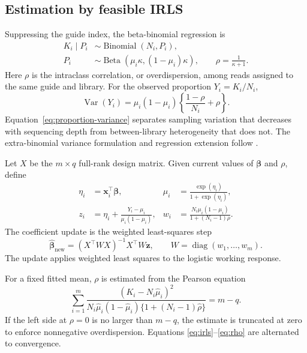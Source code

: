 \subsection{Estimation by feasible IRLS}
\label{sec:estimation}

Suppressing the guide index, the beta-binomial regression is
\begin{align}
  K_i\mid P_i &\sim \operatorname{Binomial}(N_i,P_i),\\
  P_i &\sim \operatorname{Beta}(\mu_i\kappa,(1-\mu_i)\kappa),
  \qquad \rho=\frac{1}{\kappa+1}.
\end{align}
Here $\rho$ is the intraclass correlation, or overdispersion, among reads
assigned to the same guide and library.  For the observed proportion
$Y_i=K_i/N_i$,
\begin{equation}
  \operatorname{Var}(Y_i)
  =\mu_i(1-\mu_i)
   \left\{\frac{1-\rho}{N_i}+\rho\right\}.
  \label{eq:proportion-variance}
\end{equation}
Equation~\eqref{eq:proportion-variance} separates sampling variation that
decreases with sequencing depth from between-library heterogeneity that does
not.  The extra-binomial variance formulation and regression extension follow \citet{williams1982extrabinomial,
baggerly2003differential,baggerly2004overdispersed}.

Let $X$ be the $m\times q$ full-rank design matrix.  Given current values of
$\boldsymbol{\beta}$ and $\rho$, define
\begin{align}
  \eta_i &= \mathbf{x}_i^\top\boldsymbol{\beta}, &
  \mu_i &= \frac{\exp(\eta_i)}{1+\exp(\eta_i)},\\
  z_i &= \eta_i+\frac{Y_i-\mu_i}{\mu_i(1-\mu_i)}, &
  w_i &= \frac{N_i\mu_i(1-\mu_i)}
  {1+(N_i-1)\rho}. \label{eq:irls}
\end{align}
The coefficient update is the weighted least-squares step
\begin{equation}
  \widehat{\boldsymbol{\beta}}_{\mathrm{new}}
  =(X^\top W X)^{-1}X^\top W\mathbf{z},
  \qquad W=\operatorname{diag}(w_1,\ldots,w_m).
  \label{eq:betaupdate}
\end{equation}
The update applies weighted least squares to the logistic working response.

For a fixed fitted mean, $\rho$ is estimated from the Pearson equation
\begin{equation}
  \sum_{i=1}^{m}
  \frac{(K_i-N_i\widehat{\mu}_i)^2}
  {N_i\widehat{\mu}_i(1-\widehat{\mu}_i)
  \{1+(N_i-1)\widehat{\rho}\}}
  =m-q. \label{eq:rho}
\end{equation}
If the left side at $\rho=0$ is no larger than $m-q$, the estimate is truncated
at zero to enforce nonnegative overdispersion.  Equations
\eqref{eq:irls}--\eqref{eq:rho} are alternated to convergence.

